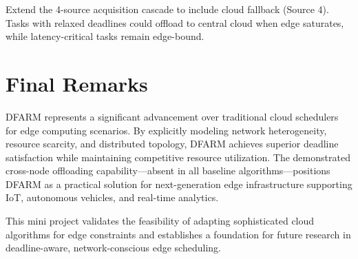 \documentclass[12pt]{report}
\begin{document}
Extend the 4-source acquisition cascade to include cloud fallback (Source 4). Tasks with relaxed deadlines could offload to central cloud when edge saturates, while latency-critical tasks remain edge-bound.

\section{Final Remarks}

DFARM represents a significant advancement over traditional cloud schedulers for edge computing scenarios. By explicitly modeling network heterogeneity, resource scarcity, and distributed topology, DFARM achieves superior deadline satisfaction while maintaining competitive resource utilization. The demonstrated cross-node offloading capability—absent in all baseline algorithms—positions DFARM as a practical solution for next-generation edge infrastructure supporting IoT, autonomous vehicles, and real-time analytics.

This mini project validates the feasibility of adapting sophisticated cloud algorithms for edge constraints and establishes a foundation for future research in deadline-aware, network-conscious edge scheduling.

\end{document}
